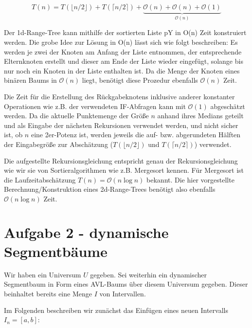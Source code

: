 \documentclass[a4paper]{article}
\begin{document}
$$T(n) = T(\lfloor n/2\rfloor) + T(\lceil n/2\rceil) + \underbrace{\mathcal{O}(n) + \mathcal{O}(n) + \mathcal{O}(1)}_{\mathcal{O}(n)}$$

Der 1d-Range-Tree kann mithilfe der 
sortierten Liste pY in O(n) Zeit konstruiert werden. Die grobe Idee zur Lösung in O(n) lässt sich 
wie folgt beschreiben: Es werden je zwei der Knoten am Anfang der Liste entnommen, der entsprechende
Elternknoten erstellt und dieser am Ende der Liste wieder eingefügt, solange bis nur noch ein Knoten
in der Liste enthalten ist. Da die Menge der Knoten eines binären Baums in $\mathcal{O}(n)$ liegt, 
benötigt diese Prozedur ebenfalls $\mathcal{O}(n)$ Zeit. 

 Die Zeit für die Erstellung des Rückgabeknotens inklusive anderer
konstanter Operationen wie z.B. der verwendeten IF-Abfragen kann mit $\mathcal{O}(1)$ abgeschätzt
werden. Da die aktuelle Punktemenge der Größe $n$ anhand ihres Medians geteilt und als Eingabe der
nächsten Rekursionen verwendet werden, und nicht sicher ist, ob $n$ eine 2er-Potenz ist, werden
jeweils die auf- bzw. abgerundeten Hälften der Eingabegröße zur Abschätzung ($T(\lfloor n/2\rfloor)$  und $T(\lceil n/2\rceil)$) verwendet. 

Die aufgestellte Rekursionsgleichung entspricht genau der Rekursionsgleichung wie wir sie von Sortieralgorithmen wie z.B. Mergesort kennen. Für Mergesort ist die Laufzeitabschätzung 
$T(n) = \mathcal{O}(n \log n)$ bekannt. Die hier vorgestellte Berechnung/Konstruktion eines
2d-Range-Trees benötigt also ebenfalls $\mathcal{O}(n \log n)$ Zeit.

\section*{Aufgabe 2 - dynamische Segmentbäume}
Wir haben ein Universum $U$ gegeben. Sei weiterhin ein dynamischer Segmentbaum in Form eines AVL-Baums über diesem Universum gegeben. Dieser beinhaltet bereits eine Menge $I$ von Intervallen. 

Im Folgenden beschreiben wir zunächst das Einfügen eines neuen Intervalls $I_n = [a,b]$:
\end{document}
